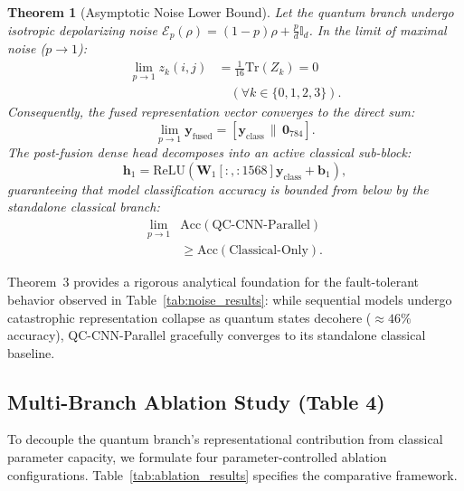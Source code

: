 \documentclass[pdflatex,sn-mathphys-num]{sn-jnl}%
\theoremstyle{thmstyleone}%
\newtheorem{theorem}{Theorem}%
\theoremstyle{thmstyletwo}%
\theoremstyle{thmstylethree}%
\begin{document}
\begin{theorem}[Asymptotic Noise Lower Bound]
Let the quantum branch undergo isotropic depolarizing noise $\mathcal{E}_p(\rho) = (1-p)\rho + \frac{p}{d}\mathbb{I}_d$. In the limit of maximal noise ($p \to 1$):
\begin{align}
\lim_{p \to 1} z_k(i, j) &= \frac{1}{16} \mathrm{Tr}(Z_k) = 0 \nonumber \\
&\quad (\forall k \in \{0, 1, 2, 3\}).
\end{align}
Consequently, the fused representation vector converges to the direct sum:
\begin{equation}
\lim_{p \to 1} \mathbf{y}_{\mathrm{fused}} = [\mathbf{y}_{\mathrm{class}} \,\|\, \mathbf{0}_{784}].
\label{eq:asymptotic_collapse}
\end{equation}
The post-fusion dense head decomposes into an active classical sub-block:
\begin{equation}
\mathbf{h}_1 = \mathrm{ReLU}\left( \mathbf{W}_1[:, :1568] \mathbf{y}_{\mathrm{class}} + \mathbf{b}_1 \right),
\end{equation}
guaranteeing that model classification accuracy is bounded from below by the standalone classical branch:
\begin{align}
\lim_{p \to 1} &\mathrm{Acc}(\text{QC-CNN-Parallel}) \nonumber \\
&\ge \mathrm{Acc}(\text{Classical-Only}).
\label{eq:accuracy_lower_bound}
\end{align}
\end{theorem}

Theorem~3 provides a rigorous analytical foundation for the fault-tolerant behavior observed in Table~\ref{tab:noise_results}: while sequential models undergo catastrophic representation collapse as quantum states decohere ($\approx 46\%$ accuracy), QC-CNN-Parallel gracefully converges to its standalone classical baseline.

\subsection{Multi-Branch Ablation Study (Table 4)}
To decouple the quantum branch's representational contribution from classical parameter capacity, we formulate four parameter-controlled ablation configurations. Table~\ref{tab:ablation_results} specifies the comparative framework.
\end{document}
